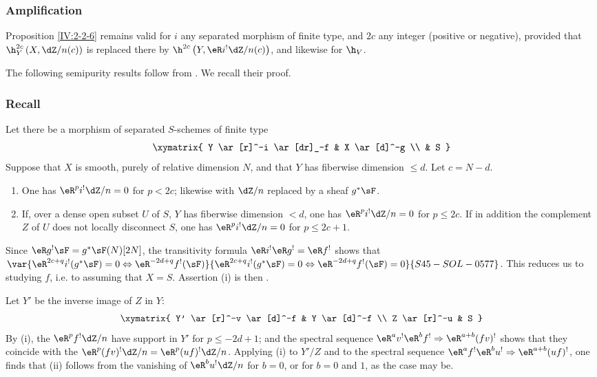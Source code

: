 \subsubsection{Amplification}\label{IV:2-2-7}

Proposition \ref{IV:2-2-6} remains valid for $i$ any separated morphism of
finite type, and $2 c$ any integer (positive or negative), provided that
$\h_Y^{2 c}\left(X,\dZ/n(c)\right)$ is replaced there by
$\h^{2 c}\left(Y,\eR i^!\dZ/n(c)\right)$, and likewise for $\h_V$.

The following semipurity results follow from \cite[XIV 1.8, 1.10, 1.15]{sga2}.
We recall their proof.






\subsubsection{Recall}\label{IV:2-2-8}
Let there be a morphism of separated $S$-schemes of finite type
\[\xymatrix{
  Y \ar[r]^-i \ar[dr]_-f
    & X \ar[d]^-g \\
  & S
}\]
Suppose that $X$ is smooth, purely of relative dimension $N$, and that $Y$
has fiberwise dimension $\leqslant d$. Let $c=N-d$.
\begin{enumerate}[\indent (i)]
  \item One has $\eR^p i^!\dZ/n=0$ for $p<2 c$; likewise with $\dZ/n$
    replaced by a sheaf $g^* \sF$.
  \item If, over a dense open subset $U$ of $S$, $Y$ has fiberwise dimension
    $<d$, one has $\eR^p i^!\dZ/n=0$ for $p\leqslant 2 c$. If in addition
    the complement $Z$ of $U$ does not locally disconnect $S$, one has
    $\eR^pi^!\dZ/n=0$ for $p\leqslant 2 c+1$.
\end{enumerate}
Since $\eR g^! \sF=g^*\sF(N)[2N]$, the transitivity formula
$\eR i^!\eR g^!=\eR f^!$ shows that
$\var{\eR^{2 c+q} i^!(g^*\sF)=0\Leftrightarrow \eR^{-2 d+q}f^!(\sF)}{\eR^{2 c+q} i^!(g^*\sF)=0\Leftrightarrow \eR^{-2 d+q}f^!(\sF)=0}{S45-SOL-0577}$. This reduces
us to studying $f$, i.e. to assuming that $X=S$. Assertion (i) is then
\cite[XVIII 3.17]{sga4}.

Let $Y'$ be the inverse image of $Z$ in $Y$:
\[\xymatrix{
  Y' \ar[r]^-v \ar[d]^-f
    & Y \ar[d]^-f \\
  Z \ar[r]^-u
    & S
}\]
By (i), the $\eR^p f^! \dZ/n$ have support in $Y'$ for
$p\leqslant -2 d+1$; and the spectral sequence
$\eR^a v^!\eR^b f^! \Rightarrow \eR^{a+b} (f v)^!$ shows that they coincide
with the $\eR^p(f v)^!\dZ/n=\eR^p(u f)^!\dZ/n$. Applying (i) to $Y'/Z$ and
to the spectral sequence
$\eR^a f^!\eR^b u^! \Rightarrow \eR^{a+b} (u f)^!$, one finds that (ii)
follows from the vanishing of $\eR^b u^! \dZ/n$ for $b=0$, or for $b=0$ and
$1$, as the case may be.






